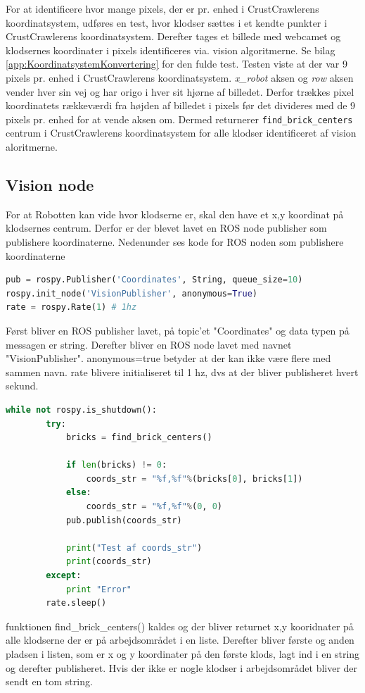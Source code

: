 
For at identificere hvor mange pixels, der er pr. enhed i CrustCrawlerens koordinatsystem, udføres en test, hvor klodser sættes i et kendte punkter i CrustCrawlerens koordinatsystem.
Derefter tages et billede med webcamet og klodsernes koordinater i pixels identificeres via. vision algoritmerne.
Se bilag \vref{app:KoordinatsystemKonvertering} for den fulde test.
Testen viste at der var 9 pixels pr. enhed i CrustCrawlerens koordinatsystem.
\textit{x\_robot} aksen og \textit{row} aksen vender hver sin vej og har origo i hver sit hjørne af billedet.
Derfor trækkes pixel koordinatets rækkeværdi fra højden af billedet i pixels før det divideres med de 9 pixels pr. enhed for at vende aksen om.
Dermed returnerer \texttt{find\_brick\_centers} centrum i CrustCrawlerens koordinatsystem for alle klodser identificeret af vision aloritmerne.

\subsection{Vision node}
For at Robotten kan vide hvor klodserne er, skal den have et x,y koordinat på klodsernes centrum.
Derfor er der blevet lavet en ROS node publisher som publishere koordinaterne.
Nedenunder ses kode for ROS noden som publishere koordinaterne \newline
\begin{lstlisting}[language=python]
pub = rospy.Publisher('Coordinates', String, queue_size=10)
rospy.init_node('VisionPublisher', anonymous=True)
rate = rospy.Rate(1) # 1hz
\end{lstlisting}
Først bliver en ROS publisher lavet, på topic'et "Coordinates" og data typen på messagen er string.
Derefter bliver en ROS node lavet med navnet "VisionPublisher". anonymous=true betyder at der kan ikke være flere med sammen navn.
rate blivere initialiseret til 1 hz, dvs at der bliver publisheret hvert sekund. \newline
\begin{lstlisting}[language=python]
while not rospy.is_shutdown():
        try:
            bricks = find_brick_centers()
            
            if len(bricks) != 0:        
                coords_str = "%f,%f"%(bricks[0], bricks[1])
            else:
                coords_str = "%f,%f"%(0, 0)          
            pub.publish(coords_str)
            
            print("Test af coords_str")
            print(coords_str)
        except:
            print "Error"
        rate.sleep()
\end{lstlisting}
funktionen find\_brick\_centers() kaldes og der bliver returnet x,y kooridnater på alle klodserne der er på arbejdsområdet i en liste.
Derefter bliver første og anden pladsen i listen, som er x og y koordinater på den første klods, lagt ind i en string og derefter publisheret.
Hvis der ikke er nogle klodser i arbejdsområdet bliver der sendt en tom string.


